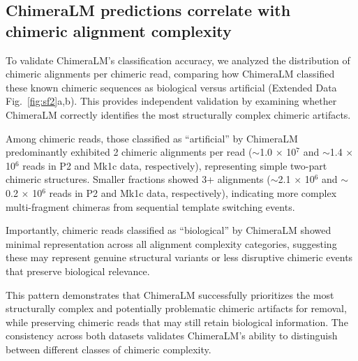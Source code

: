 \documentclass[pdflatex,sn-nature]{sn-jnl}%
\theoremstyle{thmstyleone}%
\theoremstyle{thmstyletwo}%
\theoremstyle{thmstylethree}%
\begin{document}
\subsection*{ChimeraLM predictions correlate with chimeric alignment complexity}

To validate ChimeraLM's classification accuracy, we analyzed the distribution of chimeric alignments per chimeric read, comparing how ChimeraLM classified these known chimeric sequences as biological versus artificial (Extended Data Fig.~\ref{fig:sf2}a,b).
This provides independent validation by examining whether ChimeraLM correctly identifies the most structurally complex chimeric artifacts.

Among chimeric reads, those classified as ``artificial'' by ChimeraLM predominantly exhibited 2 chimeric alignments per read ($\sim$1.0 $\times$ 10$^7$ and $\sim$1.4 $\times$ 10$^6$ reads in P2 and Mk1c data, respectively), representing simple two-part chimeric structures.
Smaller fractions showed 3+ alignments ($\sim$2.1 $\times$ 10$^6$ and $\sim$0.2 $\times$ 10$^6$ reads in P2 and Mk1c data, respectively), indicating more complex multi-fragment chimeras from sequential template switching events.

Importantly, chimeric reads classified as ``biological'' by ChimeraLM showed minimal representation across all alignment complexity categories, suggesting these may represent genuine structural variants or less disruptive chimeric events that preserve biological relevance.

This pattern demonstrates that ChimeraLM successfully prioritizes the most structurally complex and potentially problematic chimeric artifacts for removal, while preserving chimeric reads that may still retain biological information.
The consistency across both datasets validates ChimeraLM's ability to distinguish between different classes of chimeric complexity.
\end{document}
